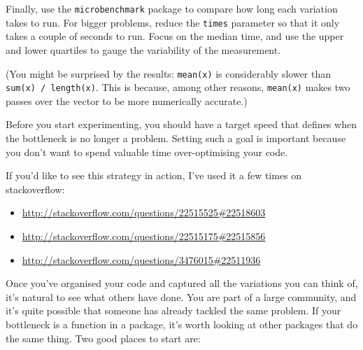 Finally, use the \texttt{microbenchmark} package to compare how long
each variation takes to run. For bigger problems, reduce the
\texttt{times} parameter so that it only takes a couple of seconds to
run. Focus on the median time, and use the upper and lower quartiles to
gauge the variability of the measurement. 

\begin{Shaded}
\begin{Highlighting}[]
\NormalTok{(}
\NormalTok{)}
\end{Highlighting}
\end{Shaded}

(You might be surprised by the results: \texttt{mean(x)} is considerably
slower than \texttt{sum(x) / length(x)}. This is because, among other
reasons, \texttt{mean(x)} makes two passes over the vector to be more
numerically accurate.)

Before you start experimenting, you should have a target speed that
defines when the bottleneck is no longer a problem. Setting such a goal
is important because you don't want to spend valuable time
over-optimising your code.

If you'd like to see this strategy in action, I've used it a few times
on stackoverflow:

\begin{itemize}
\itemsep1pt\parskip0pt
\item
  \url{http://stackoverflow.com/questions/22515525\#22518603}
\item
  \url{http://stackoverflow.com/questions/22515175\#22515856}
\item
  \url{http://stackoverflow.com/questions/3476015\#22511936}
\end{itemize}


Once you've organised your code and captured all the variations you can
think of, it's natural to see what others have done. You are part of a
large community, and it's quite possible that someone has already
tackled the same problem. If your bottleneck is a function in a package,
it's worth looking at other packages that do the same thing. Two good
places to start are:

